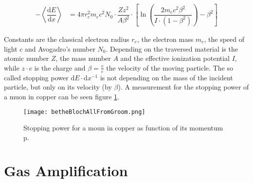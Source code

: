 \documentclass[
a4paper,                                %
twoside,                                %
BCOR1.4cm,                      %
10pt,                           %
headings=normal,                %
headsepline,                    %
clearplainpage, %
final,                                  %
div=14,
parskip=full,
openright,
bibliography=toc
]{scrreprt}
\begin{document}
\begin{align}
	-\left\langle\dfrac{\mathrm{d}E}{\mathrm{d}x}\right\rangle &= 
		4\pi r_{e}^{2} m_{e} c^{2} N_{0}
		\cdot \dfrac{Z z^{2}}{A \beta^{2}}
		\cdot\left[\ln\left(\dfrac{2m_{e}c^{2}\beta^{2}}{I\cdot\left(1-\beta^{2}\right)}\right)-\beta^{2}\right]
\end{align}

Constants are the classical electron radius $r_{e}$, the electron mass $m_{e}$, the speed of light $c$ and Avogadro's number $N_{0}$. Depending on the traversed material is the atomic number $Z$, the mass number $A$ and the effective ionization potential $I$, while $z\cdot e$  is the charge and $\beta=\tfrac{v}{c}$ the velocity of the moving particle. The so called stopping power $\mathrm{d}E \cdot \mathrm{d}x^{-1}$ is not depending on the mass of the incident particle, but only on its velocity (by $\beta$). A measurement for the stopping power of a muon in copper can be seen figure \ref{stopPow}.
 \cite{kleinknecht}
 
\begin{figure}[H]
	\centering
 	\texttt{[image: betheBlochAllFromGroom.png]}
 	\caption{Stopping power for a moun in copper as function of its momentum p.	\cite{groomStop}}
 	\label{stopPow}
\end{figure}

\section{Gas Amplification}\label{gasAmp}
\end{document}
